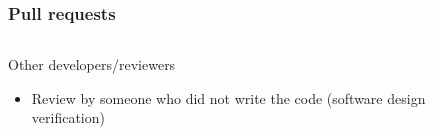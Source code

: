 \documentclass[12pt]{beamer}
\begin{document}
\begin{frame}
\frametitle{Pull requests}

\begin{columns}
\begin{column}{0.5\textwidth}

Other developers/reviewers
    \begin{itemize}
    \item{Review by someone who did not write the code (\alert{software design verification})}
    \end{itemize}
\end{column}
\begin{column}{0.5\textwidth}

\end{column}
\end{columns}
\end{frame}
\end{document}
